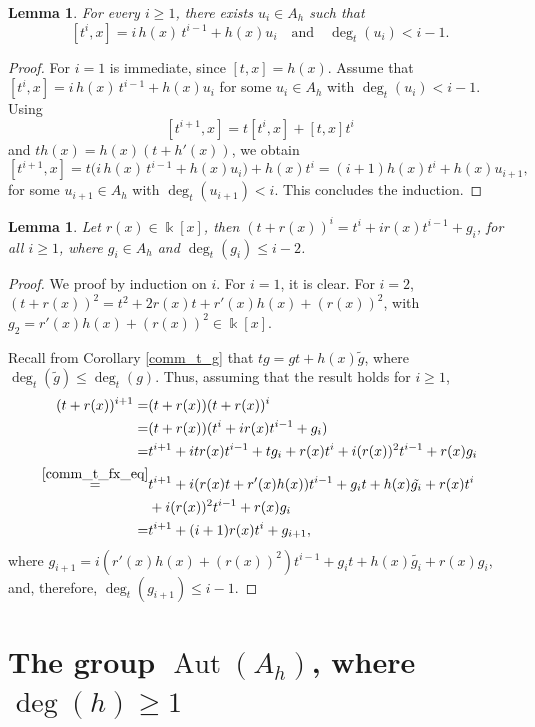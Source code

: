 \documentclass{article}
\numberwithin{equation}{section}\theoremstyle{plain}
\newtheorem{lemma}[theorem]{Lemma}
\DeclareMathOperator{\Aut}{Aut}
\begin{document}
\begin{lemma}\label{lematix}
For every $i\ge 1$, there exists $u_i\in A_h$ such that
\[
[t^i,x]=i\,h(x)\,t^{i-1}+h(x)u_i
\quad\text{and}\quad
\deg_t(u_i)<i-1.
\]
\end{lemma}

\begin{proof}
For $i=1$ is immediate, since $[t,x]=h(x)$.
Assume that $[t^i,x]=i\,h(x)\,t^{i-1}+h(x)u_i$ for some $u_i\in A_h$ with $\deg_t(u_i)<i-1$. Using
\[
[t^{i+1},x]=t[t^i,x]+[t,x]t^i
\]
and $th(x)=h(x)(t+h'(x))$, we obtain
\[
[t^{i+1},x]
=t\bigl(i\,h(x)\,t^{i-1}+h(x)u_i\bigr)+h(x)t^i
=(i+1)h(x)t^i+h(x)u_{i+1},
\]
for some $u_{i+1}\in A_h$ with $\deg_t(u_{i+1})<i$. This concludes the induction.
\end{proof}

\medbreak

\begin{lemma}\label{lema_rhotnai}
Let $r(x)\in\Bbbk[x]$, then 
    $(t+r(x))^i=t^i+ir(x)t^{i-1}+g_i$, for all $i \geq 1$, where $g_i\in A_h$ and $\deg_{t}(g_i)\leq i-2$.
\end{lemma}
\begin{proof}
    We proof by induction on $i$.
    For $i=1$, it is clear.
    For $i=2$, $(t+r(x))^2=t^2+2r(x)t+r'(x)h(x)+(r(x))^2$, with $g_2=r'(x)h(x)+(r(x))^2\in\Bbbk[x]$.
    
    Recall from Corollary \ref{comm_t_g} that $tg=gt+h(x)\tilde{g}$, where $\deg_t(\tilde{g}) \leq \deg_t(g)$.
    Thus, assuming that the result holds for $i \geq 1$, 
    \begin{align*}
    (t+r(x))^{i+1} = & (t+r(x)) (t+r(x))^i \\
    = &  (t+r(x))(t^i + i r(x) t^{i-1} + g_i) \\
    = & t^{i+1} + i t r(x) t^{i-1} + t g_i+ r(x) t^i + i (r(x))^2 t^{i-1} +r(x) g_i \\
\stackrel{\eqref{comm_t_fx_eq}}{=} & t^{i+1} + i( r(x) t + r'(x)h(x)) t^{i-1} + g_i t + h(x) \tilde{g_i} + r(x)t^i \\
    & + i (r(x))^2 t^{i-1} + r(x) g_i \\
    = & t^{i+1} + (i+1)r(x) t^i + g_{i+1},
    \end{align*}
    where $g_{i+1} = i (r'(x)h(x) + (r(x))^2) t^{i-1} + g_i t + h(x) \tilde{g_i} +  r(x) g_i$, and, therefore, $\deg_t(g_{i+1}) \leq i-1$.
\end{proof}

\section{The group $\Aut(A_h)$, where $\deg(h)  \geq 1$}\label{section3}
\end{document}
